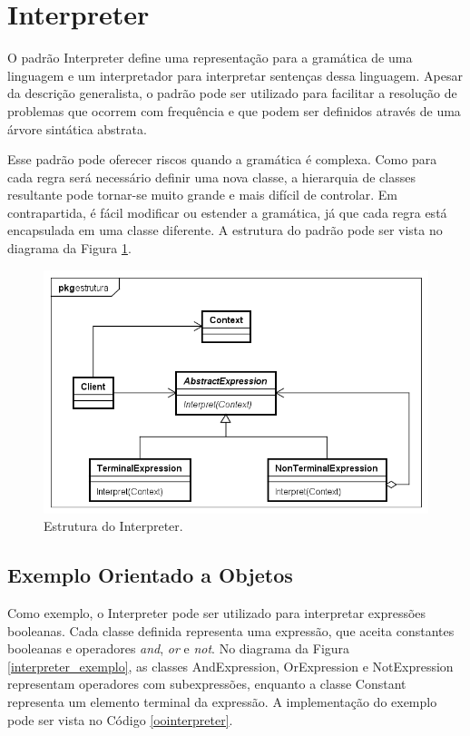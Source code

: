 \section{Interpreter}

O padrão Interpreter define uma representação para 
a gramática de uma linguagem e um interpretador para 
interpretar sentenças dessa linguagem. Apesar da 
descrição generalista, o padrão 
pode ser utilizado para facilitar a resolução de 
problemas que ocorrem com frequência e que podem 
ser definidos através de uma árvore sintática 
abstrata.\cite{gamma:1995}

Esse padrão pode oferecer riscos quando a gramática 
é complexa. Como para cada regra será necessário 
definir uma nova classe, a hierarquia de classes 
resultante pode tornar-se muito grande e mais 
difícil de controlar. Em contrapartida, é 
fácil modificar ou estender a gramática, já 
que cada regra está encapsulada em uma classe 
diferente. A estrutura do padrão pode ser vista 
no diagrama da Figura \ref{interpreter_struct}.

\begin{figure}[htb]
	\caption{\label{interpreter_struct}Estrutura do Interpreter.}
	\begin{center}
	    \includegraphics[scale=0.5]{5_padroes-contexto-funcional/5.3_comportamentais/5.3.03_interpreter/Interpreter_struct.png}
	\end{center}
\end{figure}

\subsection*{Exemplo Orientado a Objetos}

Como exemplo, o Interpreter pode ser utilizado para 
interpretar expressões booleanas. Cada classe definida 
representa uma expressão, que aceita constantes  
booleanas e operadores \textit{and}, \textit{or} e 
\textit{not}. No diagrama da Figura \ref{interpreter_exemplo}, 
as classes AndExpression, OrExpression e 
NotExpression representam operadores com subexpressões, 
enquanto a classe Constant representa um elemento 
terminal da expressão. A implementação do exemplo 
pode ser vista no Código \ref{oointerpreter}.

